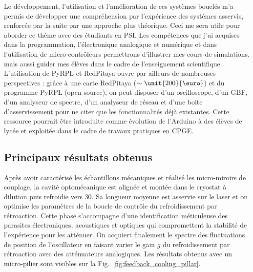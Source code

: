 \documentclass[12pt,a4paper]{article}
\newenvironment{mep}{%
\addcontentsline{ldf}{figure}{0}%
\begin{mep_env}
\small}
{\end{mep_env}}
\begin{document}
\begin{mep}
Le développement, l'utilisation et l'amélioration de ces systèmes bouclés m'a permis de développer une compréhension par l'expérience des systèmes asservis, renforcée par la suite par une approche plus théorique.
Ceci me sera utile pour aborder ce thème avec des étudiants en PSI.
Les compétences que j'ai acquises dans la programmation, l'électronique analogique et numérique et dans l'utilisation de micro-contrôleurs permettrons d'illustrer mes cours de simulations, mais aussi guider mes élèves dans le cadre de l'enseignement scientifique.
L'utilisation de PyRPL et RedPitaya ouvre par ailleurs de nombreuses perspectives : grâce à une carte RedPitaya ($\sim\unit{200}{\text{\euro}}$) et du programme PyRPL (open source), on peut disposer d'un oscilloscope, d'un GBF, d'un analyseur de spectre, d'un analyseur de réseau et d'une boite d'asservissement pour ne citer que les fonctionnalités déjà existantes.
Cette ressource pourrait être introduite comme évolution de l'Arduino à des élèves de lycée et exploitée dans le cadre de travaux pratiques en CPGE.
\end{mep}

\subsection{Principaux résultats obtenus}
\label{sec:results}

Après avoir caractérisé les échantillons mécaniques et réalisé les micro-miroirs de couplage, la cavité optomécanique est alignée et montée dans le cryostat à dilution puis refroidie vers \unit{30}{\milli\kelvin}.
Sa longueur moyenne est asservie sur le laser et on optimise les paramètres de la boucle de contrôle du refroidissement par rétroaction.
Cette phase s'accompagne d'une identification méticuleuse des parasites électroniques, acoustiques et optiques qui compromettent la stabilité de l'expérience pour les atténuer.
On acquiert finalement le spectre des fluctuations de position de l'oscillateur en faisant varier le gain $g$ du refroidissement par rétroaction avec des atténuateurs analogiques.
Les résultats obtenus avec un micro-pilier sont visibles sur la Fig.~\ref{fig:feedback_cooling_pillar}.
\end{document}
